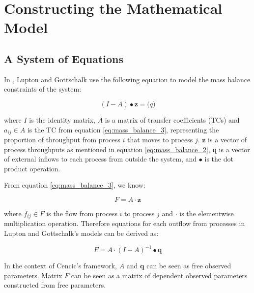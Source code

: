 \documentclass[ %
                    author={Tom Jager},
                supervisor={Dr. Daniel Schien},
                    degree={MEng},
                     title={A Bayesian Inference Engine for UMIS Structured Data},
                  subtitle={},
                      type={research},
                      year={2019} ]{dissertation}
\begin{document}
\section{Constructing the Mathematical Model}
\subsection{A System of Equations}
In \cite{lupton2018incremental, gottschalk2010probabilistic}, Lupton and Gottschalk use the following equation to model the mass balance constraints of the system:

\begin{equation}
    (I - A)\bullet\bm{z} = \bm(q)
\end{equation}

where $I$ is the identity matrix, $A$ is a matrix of transfer coefficients (TCs) and $a_{ij} \in A$ is the TC from equation \ref{eq:mass_balance_3}, representing the proportion of throughput from process $i$ that moves to process $j$. $\bm{z}$ is a vector of process throughputs as mentioned in equation \ref{eq:mass_balance_2}, $\bm{q}$ is a vector of external inflows to each process from outside the system, and $\bullet$ is the dot product operation.

From equation \ref{eq:mass_balance_3}, we know:

\begin{equation}
    F=A \cdot \bm{z}
\end{equation}

where $f_{ij} \in F$ is the flow from process $i$ to process $j$ and $\cdot$ is the elementwise multiplication operation. Therefore equations for each outflow from processes in Lupton and Gottschalk's models can be derived as:

\begin{equation}
    F=A \cdot (I-A)^{-1} \bullet \bm{q}
\end{equation}

In the context of Cencic's framework, $A$ and $\bm{q}$ can be seen as free observed parameters. Matrix $F$ can be seen as a matrix of dependent observed parameters constructed from free parameters. 

\end{document}
